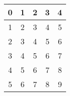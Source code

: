 \documentclass[a4paper,11pt]{article}
\date{}
\begin{document}
\begin{tabular}{| c | c | c | c | c |}
 \hline
0 & 1 & 2 & 3 & 4 \\
 \hline
1 & 2 & 3 & 4 & 5 \\
 \hline
2 & 3 & 4 & 5 & 6 \\
 \hline
3 & 4 & 5 & 6 & 7 \\
 \hline
4 & 5 & 6 & 7 & 8 \\
 \hline
5 & 6 & 7 & 8 & 9 \\
 \hline
\end{tabular}
\end{document}
